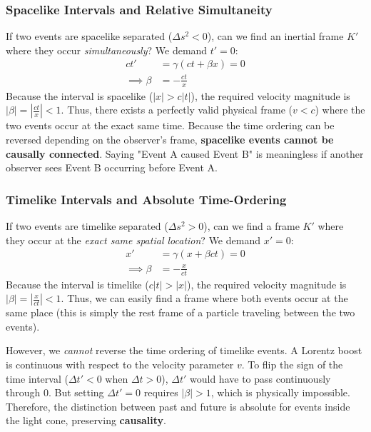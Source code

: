\subsubsection*{Spacelike Intervals and Relative Simultaneity}
If two events are spacelike separated ($\Delta s^2 < 0$), can we find an inertial frame $K'$ where they occur \textit{simultaneously}?
We demand $t' = 0$:
\begin{align}
    c t' &= \gamma \left(c t + \beta x\right) = 0 \\
    \implies \beta &= - \frac{ct}{x}
    \label{eq:lec04:simultaneous-frame}
\end{align}
Because the interval is spacelike ($|x| > c|t|$), the required velocity magnitude is $|\beta| = \left| \frac{ct}{x} \right| < 1$. Thus, there exists a perfectly valid physical frame ($v < c$) where the two events occur at the exact same time. 
Because the time ordering can be reversed depending on the observer's frame, \textbf{spacelike events cannot be causally connected}. Saying "Event A caused Event B" is meaningless if another observer sees Event B occurring before Event A.

\subsubsection*{Timelike Intervals and Absolute Time-Ordering}
If two events are timelike separated ($\Delta s^2 > 0$), can we find a frame $K'$ where they occur at the \textit{exact same spatial location}?
We demand $x' = 0$:
\begin{align}
    x' &= \gamma (x + \beta c t) = 0 \\
    \implies \beta &= - \frac{x}{ct}
    \label{eq:lec04:colocated-frame}
\end{align}
Because the interval is timelike ($c|t| > |x|$), the required velocity magnitude is $|\beta| = \left| \frac{x}{ct} \right| < 1$. Thus, we can easily find a frame where both events occur at the same place (this is simply the rest frame of a particle traveling between the two events).

However, we \textit{cannot} reverse the time ordering of timelike events. A Lorentz boost is continuous with respect to the velocity parameter $v$. To flip the sign of the time interval ($\Delta t' < 0$ when $\Delta t > 0$), $\Delta t'$ would have to pass continuously through $0$. But setting $\Delta t' = 0$ requires $|\beta| > 1$, which is physically impossible. Therefore, the distinction between past and future is absolute for events inside the light cone, preserving \textbf{causality}.

